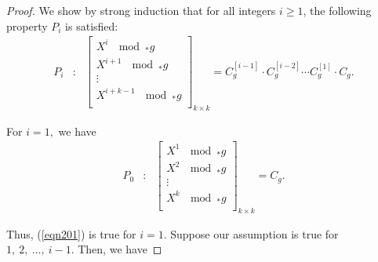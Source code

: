 \documentclass[10pt,a4paper]{amsart}
\begin{document}
\begin{proof}
    	We show by strong induction that for all integers $i\geq 1$, the following property $P_i$ is satisfied:
	\begin{eqnarray}\label{eqn201}
		P_i&:&\begin{bmatrix}
			X^i ~ \mod _*g \\
			X^{i+1} ~ \mod _*g  \\
			\vdots\\
			X^{i+k-1} ~ \mod _*g  \\
		\end{bmatrix}_{k\times k}=C^{[i-1]}_g\cdot C^{[i-2]}_g\cdots C^{[1]}_g\cdot C_g.
	\end{eqnarray}	
    
    For $i=1,$ we have 
	\begin{eqnarray}
		P_0&:&\begin{bmatrix}
			X^1 ~ \mod _*g  \\
			X^{2} ~ \mod _*g  \\
			\vdots\\
			X^{k} ~ \mod _*g  \\
			
		\end{bmatrix}_{k\times k}=C_g.
	\end{eqnarray}
    
	Thus, (\ref{eqn201}) is true for $i=1$. Suppose our assumption is true for $1,~2,~\dots,~i-1$. Then, we have
	
	

\end{proof}
\end{document}

